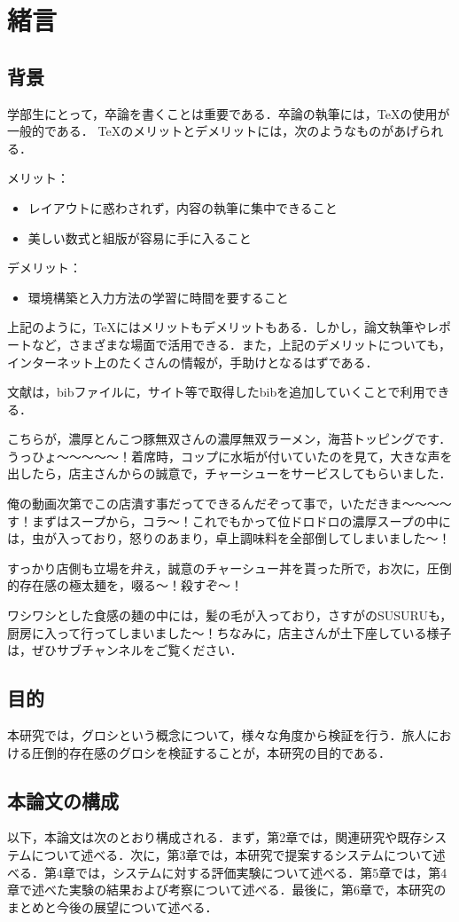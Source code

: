 \documentclass[main]{subfiles}
\begin{document}
\chapter{緒言}
\section{背景}
学部生にとって，卒論を書くことは重要である\cite{Agarwal2012}．卒論の執筆には，\TeX の使用が一般的である．
\TeX のメリットとデメリットには，次のようなものがあげられる．

\begin{description}
    \item{メリット：} 
        \begin{itemize}
            \item レイアウトに惑わされず，内容の執筆に集中できること
            \item 美しい数式と組版が容易に手に入ること
        \end{itemize}
    \item{デメリット：}
        \begin{itemize}
            \item 環境構築と入力方法の学習に時間を要すること
        \end{itemize}
\end{description}

上記のように，\TeX にはメリットもデメリットもある．しかし，論文執筆やレポートなど，さまざまな場面で活用できる．また，上記のデメリットについても，インターネット上のたくさんの情報が，手助けとなるはずである\cite{Rao:AMCQG_Survey}．

文献は，bibファイルに，サイト等で取得したbibを追加していくことで利用できる．

こちらが，濃厚とんこつ豚無双さんの濃厚無双ラーメン，海苔トッピングです．うっひょ～～～～～！着席時，コップに水垢が付いていたのを見て，大きな声を出したら，店主さんからの誠意で，チャーシューをサービスしてもらいました．

俺の動画次第でこの店潰す事だってできるんだぞって事で，いただきま～～～～す！まずはスープから，コラ～！これでもかって位ドロドロの濃厚スープの中には，虫が入っており，怒りのあまり，卓上調味料を全部倒してしまいました～！

すっかり店側も立場を弁え，誠意のチャーシュー丼を貰った所で，お次に，圧倒的存在感の極太麺を，啜る～！殺すぞ～！

ワシワシとした食感の麺の中には，髪の毛が入っており，さすがのSUSURUも，厨房に入って行ってしまいました～！ちなみに，店主さんが土下座している様子は，ぜひサブチャンネルをご覧ください．

\section{目的}
本研究では，グロシという概念について，様々な角度から検証を行う．旅人における圧倒的存在感のグロシを検証することが，本研究の目的である．

\section{本論文の構成}
以下，本論文は次のとおり構成される．まず，第2章では，関連研究や既存システムについて述べる．次に，第3章では，本研究で提案するシステムについて述べる．第4章では，システムに対する評価実験について述べる．第5章では，第4章で述べた実験の結果および考察について述べる．最後に，第6章で，本研究のまとめと今後の展望について述べる．
\end{document}
